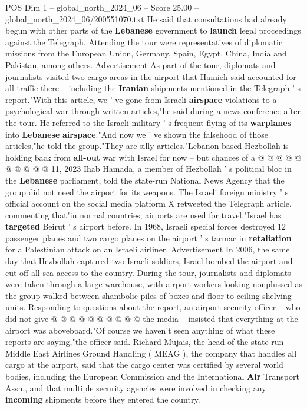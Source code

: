 \begin{textsample}{POS Dim 1 – global\_north\_2024\_06 – Score 25.00 – global\_north\_2024\_06/200551070.txt}
He said that consultations had already begun with other parts of the \textbf{Lebanese} government to \textbf{launch} legal proceedings against the Telegraph.
Attending the tour were representatives of diplomatic missions from the European Union, Germany, Spain, Egypt, China, India and Pakistan, among others.
Advertisement As part of the tour, diplomats and journalists visited two cargo areas in the airport that Hamieh said accounted for all traffic there -- including the \textbf{Iranian} shipments mentioned in the Telegraph ' s report."With this article, we ' ve gone from Israeli \textbf{airspace} violations to a psychological war through written articles,"he said during a news conference after the tour.
He referred to the Israeli military ' s frequent flying of its \textbf{warplanes} into \textbf{Lebanese} \textbf{airspace}."And now we ' ve shown the falsehood of those articles,"he told the group."They are silly articles."Lebanon-based Hezbollah is holding back from \textbf{all-out} war with Israel for now -- but chances of a @ @ @ @ @ @ @ @ @ @ 11, 2023 Ihab Hamada, a member of Hezbollah ' s political bloc in the \textbf{Lebanese} parliament, told the state-run National News Agency that the group did not need the airport for its weapons.
The Israeli foreign ministry ' s official account on the social media platform X retweeted the Telegraph article, commenting that"in normal countries, airports are used for travel."Israel has \textbf{targeted} Beirut ' s airport before.
In 1968, Israeli special forces destroyed 12 passenger planes and two cargo planes on the airport ' s tarmac in \textbf{retaliation} for a Palestinian attack on an Israeli airliner.
Advertisement In 2006, the same day that Hezbollah captured two Israeli soldiers, Israel bombed the airport and cut off all sea access to the country.
During the tour, journalists and diplomats were taken through a large warehouse, with airport workers looking nonplussed as the group walked between shambolic piles of boxes and floor-to-ceiling shelving units.
Responding to questions about the report, an airport security officer -- who did not give @ @ @ @ @ @ @ @ @ @ the media -- insisted that everything at the airport was aboveboard."Of course we haven't seen anything of what these reports are saying,"the officer said.
Richard Mujais, the head of the state-run Middle East Airlines Ground Handling ( MEAG ), the company that handles all cargo at the airport, said that the cargo center was certified by several world bodies, including the European Commission and the International \textbf{Air} Transport Assn., and that multiple security agencies were involved in checking any \textbf{incoming} shipments before they entered the country.

\end{textsample}
